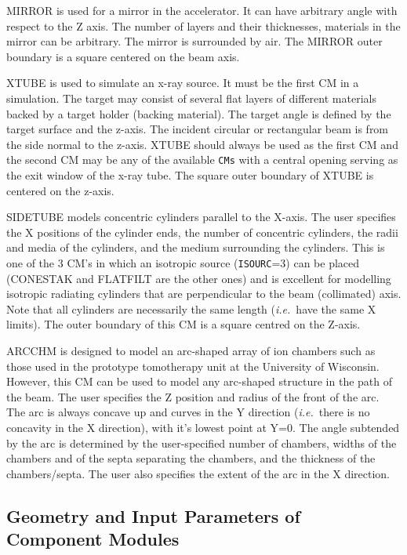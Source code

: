 \documentclass[12pt,twoside]{article}
\newcommand{\ie}{{\em i.e.}}
\begin{document}
MIRROR is used for a mirror in the accelerator. It can have arbitrary angle
with respect to the Z axis. The number of layers and their thicknesses,
materials in the mirror can be arbitrary. The mirror is surrounded by air.
The MIRROR outer boundary is a square centered on the beam axis.

XTUBE is used to simulate an x-ray source.  It must be the first CM in a
simulation. The target
may consist of several flat layers of different materials backed by a target
holder (backing material). The target angle is defined by the target surface
and the z-axis.  The incident circular or rectangular  beam is from the side
normal to the z-axis. XTUBE should always be used as the first CM and the second CM
may be any of the available  \verb+CMs+ with a central opening serving as the exit
window of the x-ray tube.  The square outer boundary of XTUBE is centered
on the z-axis.

SIDETUBE models concentric cylinders parallel to the X-axis.  The user
specifies the X positions of the cylinder ends, the number of concentric
cylinders, the radii and media of the cylinders, and the medium surrounding
the cylinders.  This is one of the 3 CM's in which an isotropic
source ({\tt ISOURC}=3) can be placed (CONESTAK and FLATFILT are the other
ones) and is excellent
for modelling isotropic radiating cylinders that are perpendicular to
the beam (collimated) axis.  Note that all cylinders are necessarily the
same length (\ie\ have the same X limits).  The outer boundary of this CM is
a square centred on the Z-axis.


ARCCHM is designed to model an arc-shaped array of ion chambers
such as those used in the prototype tomotherapy unit at the University of
Wisconsin.  However, this CM can
be used to model any arc-shaped structure in the path of the beam.  The
user specifies the Z position and radius of the front of the arc.  The arc
is always concave up and curves in the Y direction (\ie\ there is no
concavity in the X direction), with it's lowest point
at Y=0.  The angle subtended by the arc is determined by the user-specified
number of chambers, widths of the chambers and of the septa separating the
chambers, and the thickness of the chambers/septa.
The user also specifies the extent of the arc in the X direction.

\subsection{Geometry and Input Parameters of Component Modules}
\end{document}
